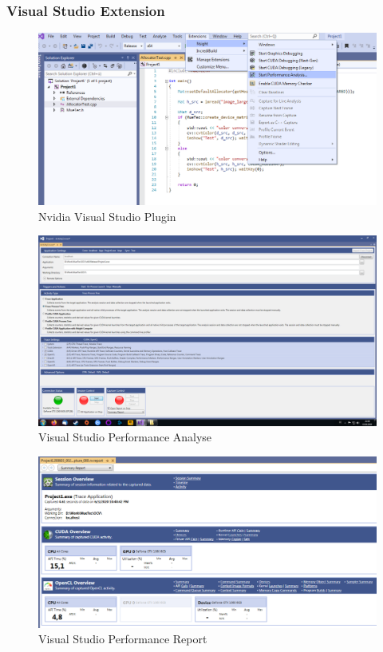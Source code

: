 			    \subsubsection*{Visual Studio Extension}
                    \begin{figure}[h]
			            \centering
			            \includegraphics[width=\textwidth]{chapter3/pictures/VSplugin.png}
			            \caption{Nvidia Visual Studio Plugin}
			            \label{fig3:vsplugin}
                    \end{figure}
                    \begin{figure}[h]
			            \centering
			            \includegraphics[width=\textwidth]{chapter3/pictures/VSact.png}
			            \caption{Visual Studio Performance Analyse}
			            \label{fig3:vsact}
                    \end{figure}
                    \begin{figure}[h]
			            \centering
			            \includegraphics[width=\textwidth]{chapter3/pictures/VSover.png}
			            \caption{Visual Studio Performance Report}
			            \label{fig3:vsover}
                    \end{figure}
